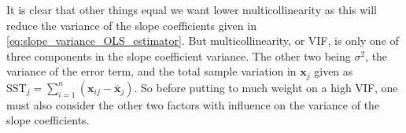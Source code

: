 It is clear that other things equal we want lower multicollinearity as this will reduce the variance of the slope coefficients given in \eqref{eq:slope_variance_OLS_estimator}.
But multicollinearity, or VIF, is only one of three components in the slope coefficient variance.
The other two being $\sigma^2$, the variance of the error term, and the total sample variation in $\textbf{x}_j$ given as $\text{SST}_j = \sum_{i=1}^n(\textbf{x}_{ij} - \overline{\textbf{x}}_j)$.
So before putting to much weight on a high VIF, one must also consider the other two factors with influence on the variance of the slope coefficients.